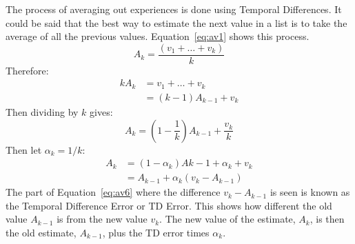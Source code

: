 The process of averaging out experiences is done using Temporal Differences. It could be said that the best way to estimate the next value in a list is to take the average of all the previous values. Equation~\ref{eq:av1} shows this process.
\begin{equation}\label{eq:av1}
A_{k} = \frac{(v_{1}+\dots+v_{k})}{k}
\end{equation}
Therefore:
\begin{align}
kA_{k} &= v_{1}+\dots+v_{k}\label{eq:av2}\\
 &= (k-1)A_{k-1}+v_{k}\label{eq:av3}
\end{align}
Then dividing by $k$ gives:
\begin{equation}\label{eq:av4}
A_{k}=(1-\frac{1}{k})A_{k-1}+\frac{v_{k}}{k}
\end{equation}
Then let $\alpha _{k}=1/k$:
\begin{align}
A_{k} &= (1-\alpha _{k})A{k-1}+\alpha _{k} + v_{k}\label{eq:av5}\\
&= A_{k-1} + \alpha _{k}(v_{k}-A_{k-1})\label{eq:av6}
\end{align}
The part of Equation~\ref{eq:av6} where the difference $v_{k}-A_{k-1}$ is seen is known as the Temporal Difference Error or TD Error. This shows how different the old value $A_{k-1}$ is from the new value $v_{k}$. The new value of the estimate, $A_{k}$, is then the old estimate, $A_{k-1}$, plus the TD error times $\alpha _{k}$.

